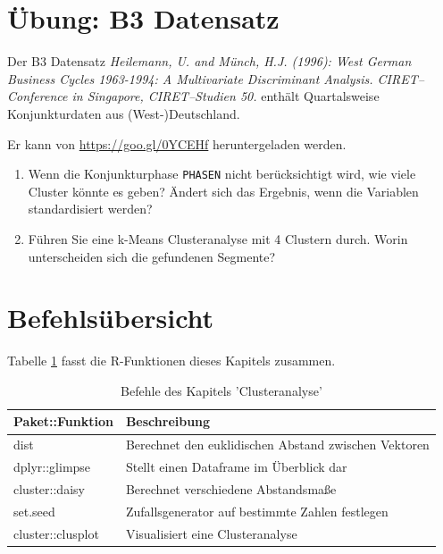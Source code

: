 \documentclass[12pt,ngerman,]{book}
\providecommand{\tightlist}{%
  \setlength{\itemsep}{0pt}\setlength{\parskip}{0pt}}
\begin{document}
\section{Übung: B3 Datensatz}\label{ubung-b3-datensatz}

Der B3 Datensatz \emph{Heilemann, U. and Münch, H.J. (1996): West German
Business Cycles 1963-1994: A Multivariate Discriminant Analysis.
CIRET--Conference in Singapore, CIRET--Studien 50.} enthält
Quartalsweise Konjunkturdaten aus (West-)Deutschland.

Er kann von \url{https://goo.gl/0YCEHf} heruntergeladen werden.

\begin{enumerate}
\def\labelenumi{\arabic{enumi}.}
\tightlist
\item
  Wenn die Konjunkturphase \texttt{PHASEN} nicht berücksichtigt wird,
  wie viele Cluster könnte es geben? Ändert sich das Ergebnis, wenn die
  Variablen standardisiert werden?
\item
  Führen Sie eine k-Means Clusteranalyse mit 4 Clustern durch. Worin
  unterscheiden sich die gefundenen Segmente?
\end{enumerate}

\section{Befehlsübersicht}\label{befehlsubersicht-9}

Tabelle \ref{tab:befehle-cluster} fasst die R-Funktionen dieses Kapitels
zusammen.

\begin{table}

\caption{\label{tab:befehle-cluster}Befehle des Kapitels 'Clusteranalyse'}
\centering
\begin{tabular}[t]{l|l}
\hline
Paket::Funktion & Beschreibung\\
\hline
dist & Berechnet den euklidischen Abstand zwischen Vektoren\\
\hline
dplyr::glimpse & Stellt einen Dataframe im Überblick dar\\
\hline
cluster::daisy & Berechnet verschiedene Abstandsmaße\\
\hline
set.seed & Zufallsgenerator auf bestimmte Zahlen festlegen\\
\hline
cluster::clusplot & Visualisiert eine Clusteranalyse\\
\hline
\end{tabular}
\end{table}
\end{document}

